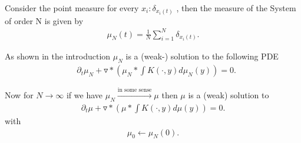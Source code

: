  \begin{definition}\label{empirical_measure}
  Consider the point measure for every $x_i : \delta_{x_{i}(t)}$ , then the measure of the System of order N is given by
 \begin{align*}
   \mu_N(t) = \frac{1}{N} \sum_{i=1}^{N} \delta_{x_{i}(t)}
 .\end{align*}
\end{definition}
As shown in the introduction $\mu_N$ is a (weak-) solution to the  following PDE 
\begin{align*}
  &\partial_t \mu_N + \triangledown * (\mu_N * \int K(\cdot,y)d \mu_N(y)) = 0
  .\end{align*}
\begin{idea}
  Now for $N\to \infty$ if we have $\mu_N \xrightarrow{\text{in some sense}} \mu $   then $\mu $ is a (weak) solution to 
  \begin{align*}
    \partial_t \mu + \triangledown * (\mu * \int K(\cdot,y)d \mu(y)) = 0
  .\end{align*}
  with 
  \begin{align*}
    \mu_0 \leftarrow \mu_N(0)
  .\end{align*}
\end{idea}
